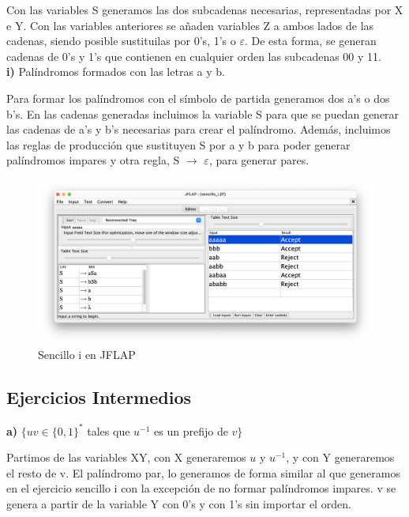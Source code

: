 Con las variables S generamos las dos subcadenas necesarias, representadas por X e Y. Con las variables anteriores se añaden variables Z a ambos lados de las
cadenas, siendo posible sustituilas por 0's, 1's o $\varepsilon$. De esta forma, se generan cadenas de 0's y 1's que contienen en cualquier orden las subcadenas 00 y 11. \\

\textbf{i)}  Palíndromos formados con las letras a y b.

Para formar los palíndromos con el símbolo de partida generamos dos a's o dos b's. En las cadenas generadas incluimos la variable S para que se puedan generar las cadenas de 
a's y b's necesarias para crear el palíndromo. Además, incluimos las reglas de producción que sustituyen S por a y b para poder generar palíndromos impares y otra regla,
S $\rightarrow$ $\varepsilon$, para generar pares.

\begin{figure}[H] 
	\centering
	\includegraphics[scale=0.375]{../practica_1/images/sencillo_i.png} 
	\caption{Sencillo i en JFLAP} 
    \label{fig:sencillo_i}
\end{figure}

\newpage

\subsection{Ejercicios Intermedios}

\textbf{a)}  $\{ uv \in \{0,1\}^{\ast} $ tales que $u^{-1}$ es un prefijo de $v\}$

Partimos de las variables XY, con X generaremos $u$ y $u^{-1}$, y con Y generaremos el resto de v. El palíndromo par, lo generamos de forma
similar al que generamos en el ejercicio sencillo i con la excepción de no formar palíndromos impares.
v se genera a partir de la variable Y con 0's y con 1's sin importar el orden.

